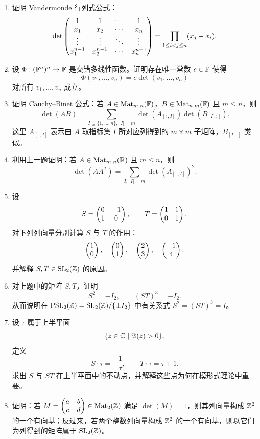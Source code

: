 \begin{enumerate}[label=\arabic*.,start=51]
  \item \hard 证明 Vandermonde 行列式公式：
  \[
  \det\begin{pmatrix} 1&1&\cdots&1\\x_1&x_2&\cdots&x_n\\\vdots&\vdots&\ddots&\vdots\\x_1^{n-1}&x_2^{n-1}&\cdots&x_n^{n-1} \end{pmatrix}
  =\prod_{1\le i<j\le n}(x_j-x_i).
  \]

  \item \hard 设 $\Phi:(\mathbb{F}^n)^n\to\mathbb{F}$ 是交错多线性函数。证明存在唯一常数 $c\in\mathbb{F}$ 使得
  \[
  \Phi(v_1,\dots,v_n)=c\det(v_1,\dots,v_n)
  \]
  对所有 $v_1,\dots,v_n$ 成立。

  \item \hard 证明 Cauchy--Binet 公式：若 $A\in\mathrm{Mat}_{m,n}(\mathbb{F})$，$B\in\mathrm{Mat}_{n,m}(\mathbb{F})$ 且 $m\le n$，则
  \[
  \det(AB)=\sum_{I\subseteq\{1,\dots,n\},\,|I|=m}\det(A_{[:,I]})\det(B_{[I,:]}).
  \]
  这里 $A_{[:,I]}$ 表示由 $A$ 取指标集 $I$ 所对应列得到的 $m\times m$ 子矩阵，$B_{[I,:]}$ 类似。

  \item \hard 利用上一题证明：若 $A\in\mathrm{Mat}_{m,n}(\mathbb{R})$ 且 $m\le n$，则
  \[
  \det(AA^T)=\sum_{I,\,|I|=m}\det(A_{[:,I]})^2.
  \]

  \item \hard 设
  \[
  S=\begin{pmatrix} 0&-1\\1&0 \end{pmatrix},\qquad T=\begin{pmatrix} 1&1\\0&1 \end{pmatrix}.
  \]
  对下列列向量分别计算 $S$ 与 $T$ 的作用：
  \[
  \begin{pmatrix} 1\\0 \end{pmatrix},\quad \begin{pmatrix} 0\\1 \end{pmatrix},\quad \begin{pmatrix} 2\\3 \end{pmatrix},\quad \begin{pmatrix} -1\\4 \end{pmatrix}.
  \]
  并解释 $S,T\in\mathrm{SL}_2(\mathbb{Z})$ 的原因。

  \item \hard 对上题中的矩阵 $S,T$，证明
  \[
  S^2=-I_2,
  \qquad
  (ST)^3=-I_2.
  \]
  从而说明在 $\mathrm{PSL}_2(\mathbb{Z})=\mathrm{SL}_2(\mathbb{Z})/\{\pm I_2\}$ 中有关系式 $S^2=(ST)^3=I$。

  \item \hard 设 $\tau$ 属于上半平面
  \[
  \{z\in\mathbb{C}\mid \Im(z)>0\},
  \]
  定义
  \[
  S\cdot\tau=-\frac{1}{\tau},\qquad T\cdot\tau=\tau+1.
  \]
  求出 $S$ 与 $ST$ 在上半平面中的不动点，并解释这些点为何在模形式理论中重要。

  \item \hard 证明：若 $M=\begin{pmatrix} a&b\\c&d \end{pmatrix}\in\mathrm{Mat}_2(\mathbb{Z})$ 满足 $\det(M)=1$，则其列向量构成 $\mathbb{Z}^2$ 的一个有向基；反过来，若两个整数列向量构成 $\mathbb{Z}^2$ 的一个有向基，则以它们为列得到的矩阵属于 $\mathrm{SL}_2(\mathbb{Z})$。


\end{enumerate}

